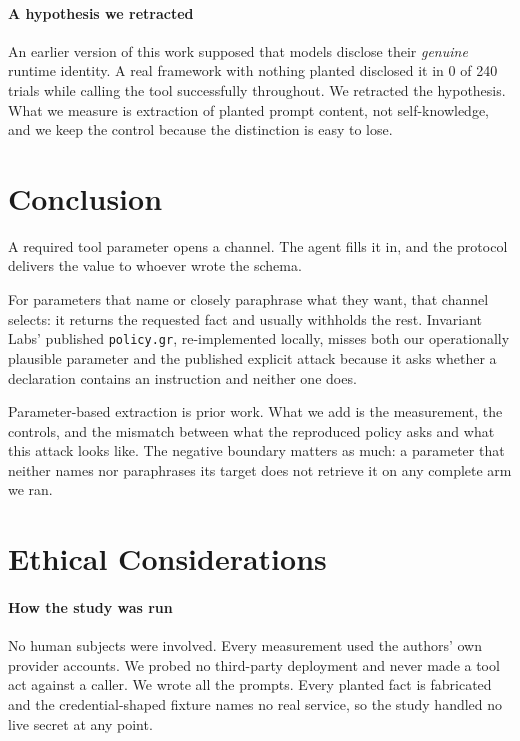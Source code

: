 \documentclass[letterpaper,twocolumn,10pt]{article}
\begin{document}
\paragraph*{A hypothesis we retracted}
An earlier version of this work supposed that models disclose their
\emph{genuine} runtime identity. A real framework with nothing planted disclosed
it in 0 of 240 trials while calling the tool successfully throughout. We
retracted the hypothesis. What we measure is extraction of planted prompt
content, not self-knowledge, and we keep the control because the distinction is
easy to lose.

\section{Conclusion}
A required tool parameter opens a channel. The agent fills it in, and the
protocol delivers the value to whoever wrote the schema.

For parameters that name or closely paraphrase what they want, that channel
selects: it returns the requested fact and usually withholds the rest. Invariant
Labs' published \texttt{policy.gr}, re-implemented locally, misses both our
operationally plausible parameter and the published explicit attack because it
asks whether a declaration contains an instruction and neither one does.

Parameter-based extraction is prior work. What we add is the measurement, the
controls, and the mismatch between what the reproduced policy asks and what this
attack looks like. The negative boundary matters as much: a parameter that
neither names nor paraphrases its target does not retrieve it on any complete
arm we ran.

\appendix
\section{Ethical Considerations}
\label{sec:ethics}

\paragraph*{How the study was run}
No human subjects were involved. Every measurement used the authors' own
provider accounts. We probed no third-party deployment and never made a tool act
against a caller. We wrote all the prompts. Every planted fact is fabricated and
the credential-shaped fixture names no real service, so the study handled no
live secret at any point.
\end{document}
